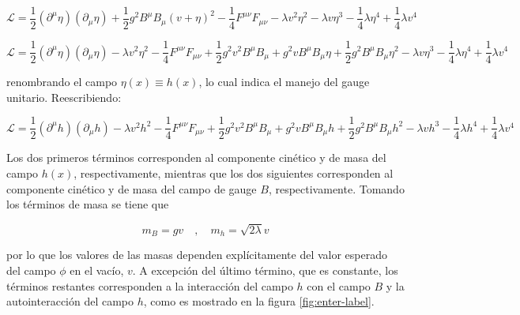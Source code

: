 $$ \mathcal{L} = \frac{1}{2}(\partial^{\mu}\eta)(\partial_{\mu}\eta) + \frac{1}{2}g^2B^{\mu}B_{\mu}(v+\eta)^2 - \frac{1}{4}F^{\mu\nu}F_{\mu\nu} -\lambda v^2 \eta^2 -\lambda v \eta^3 -\frac{1}{4}\lambda \eta^4 + \frac{1}{4}\lambda v^4 $$

$$ \mathcal{L} = \frac{1}{2}(\partial^{\mu}\eta)(\partial_{\mu}\eta) -\lambda v^2 \eta^2 - \frac{1}{4}F^{\mu\nu}F_{\mu\nu} + \frac{1}{2}g^2v^2 B^{\mu}B_{\mu} + g^2vB^{\mu}B_{\mu}\eta + \frac{1}{2}g^2B^{\mu}B_{\mu}\eta^2 -\lambda v \eta^3 -\frac{1}{4}\lambda \eta^4 + \frac{1}{4}\lambda v^4 $$

renombrando el campo $\eta(x)\equiv h(x)$, lo cual indica el manejo del gauge unitario. Reescribiendo:

\begin{equation}
    \mathcal{L} = \frac{1}{2}(\partial^{\mu}h)(\partial_{\mu}h) -\lambda v^2 h^2 - \frac{1}{4}F^{\mu\nu}F_{\mu\nu} + \frac{1}{2}g^2v^2 B^{\mu}B_{\mu} + g^2vB^{\mu}B_{\mu}h + \frac{1}{2}g^2B^{\mu}B_{\mu}h^2 -\lambda v h^3 -\frac{1}{4}\lambda h^4 + \frac{1}{4}\lambda v^4
\end{equation}

Los dos primeros términos corresponden al componente cinético y de masa del campo $h(x)$, respectivamente, mientras que los dos siguientes corresponden al componente cinético y de masa del campo de gauge $B$, respectivamente. Tomando los términos de masa se tiene que 

$$ m_B = gv \quad , \quad m_h = \sqrt{2\lambda}v $$

por lo que los valores de las masas dependen explícitamente del valor esperado del campo $\phi$ en el vacío, $v$. A excepción del último término, que es constante, los términos restantes corresponden a la interacción del campo $h$ con el campo $B$ y la autointeracción del campo $h$, como es mostrado en la figura \ref{fig:enter-label}.

